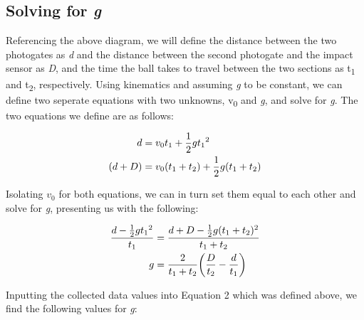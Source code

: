\documentclass[titlepage]{article}
\begin{document}
\subsection{Solving for \textit{g}}
Referencing the above diagram, we will define the distance between the two photogates as \textit{d} and the distance between the second photogate and the impact sensor as \textit{D}, and the time the ball takes to travel between the two sections as t\textsubscript{1} and t\textsubscript{2}, respectively. Using kinematics and assuming \textit{g} to be constant, we can define two seperate equations with two unknowns, v\textsubscript{0} and \textit{g}, and solve for \textit{g}. The two equations we define are as follows:

\begin{equation}
    \begin{aligned}
         d &= v_0 t_1 + \frac{1}{2}g t_1\textsuperscript{2} \\
        (d + D) &= v_0(t_1 + t_2) + \frac{1}{2}g(t_1 + t_2)
    \end{aligned}
\end{equation}

\pagebreak

Isolating $v_0$ for both equations, we can in turn set them equal to each other and solve for \textit{g}, presenting us with the following:

\begin{equation}
    \begin{split}
        \frac{d-\frac{1}{2}g t_1\textsuperscript{2}}{t_1} &= \frac{d + D-\frac{1}{2}g(t_1 + t_2)^2}{t_1 + t_2} \\
        g &= \frac{2}{t_1+t_2} \bigg ( \frac{D}{t_2} - \frac{d}{t_1} \bigg )
    \end{split}
\end{equation}

Inputting the collected data values into Equation 2 which was defined above, we find the following values for \textit{g}:
\end{document}
